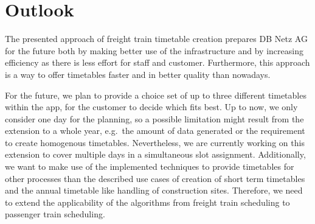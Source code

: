 \section{Outlook}
\label{chap:outlook}
The presented approach of freight train timetable creation prepares DB Netz AG for the future both by making better use of the infrastructure and by increasing efficiency as there is less effort for staff and customer. Furthermore, this approach is a way to offer timetables faster and in better quality than nowadays.

For the future, we plan to provide a choice set of up to three different timetables within the app, for the customer to decide which fits best. Up to now, we only consider one day for the planning, so a possible limitation might result from the extension to a whole year, e.g.\ the amount of data generated or the requirement to create homogenous timetables. Nevertheless, we are currently working on this extension to cover multiple days in a simultaneous slot assignment.
Additionally, we want to make use of the implemented techniques to provide timetables for other processes than the described use cases of creation of short term timetables and the annual timetable like handling of construction sites. Therefore, we need to extend the applicability of the algorithms from freight train scheduling to passenger train scheduling.
